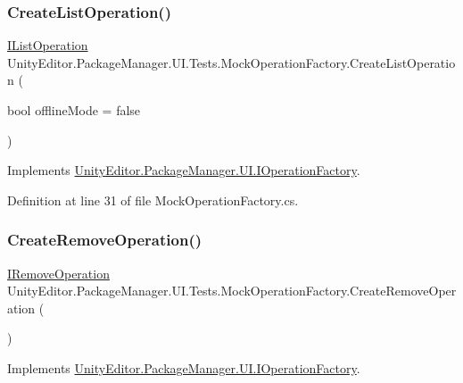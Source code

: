 \subsubsection{\texorpdfstring{CreateListOperation()}{CreateListOperation()}}
{\footnotesize\ttfamily \mbox{\hyperlink{interface_unity_editor_1_1_package_manager_1_1_u_i_1_1_i_list_operation}{I\+List\+Operation}} Unity\+Editor.\+Package\+Manager.\+U\+I.\+Tests.\+Mock\+Operation\+Factory.\+Create\+List\+Operation (\begin{DoxyParamCaption}\item[{bool}]{offline\+Mode = {\ttfamily false} }\end{DoxyParamCaption})}



Implements \mbox{\hyperlink{interface_unity_editor_1_1_package_manager_1_1_u_i_1_1_i_operation_factory_a4a8dc6a8401962d62f9fe1e4eb83cde6}{Unity\+Editor.\+Package\+Manager.\+U\+I.\+I\+Operation\+Factory}}.



Definition at line 31 of file Mock\+Operation\+Factory.\+cs.

\mbox{\label{class_unity_editor_1_1_package_manager_1_1_u_i_1_1_tests_1_1_mock_operation_factory_a548fecbf2178df4f76eba8308584766c}} 
\subsubsection{\texorpdfstring{CreateRemoveOperation()}{CreateRemoveOperation()}}
{\footnotesize\ttfamily \mbox{\hyperlink{interface_unity_editor_1_1_package_manager_1_1_u_i_1_1_i_remove_operation}{I\+Remove\+Operation}} Unity\+Editor.\+Package\+Manager.\+U\+I.\+Tests.\+Mock\+Operation\+Factory.\+Create\+Remove\+Operation (\begin{DoxyParamCaption}{ }\end{DoxyParamCaption})}



Implements \mbox{\hyperlink{interface_unity_editor_1_1_package_manager_1_1_u_i_1_1_i_operation_factory_aa8a45874d7de57734cf4d7591b07c561}{Unity\+Editor.\+Package\+Manager.\+U\+I.\+I\+Operation\+Factory}}.



